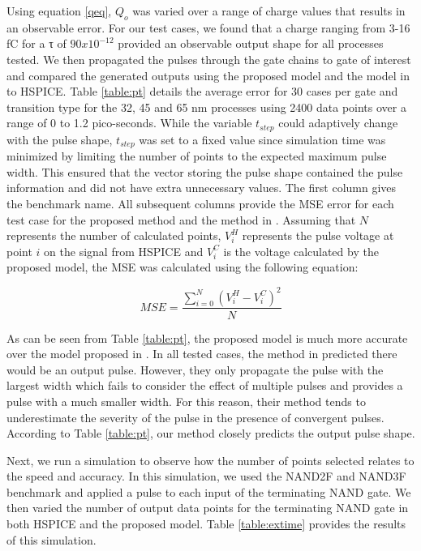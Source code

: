 Using equation \ref{qeq}, $Q_o$ was varied over a range of charge values that results in an observable error. For our test cases, we found that a charge ranging from 3-16 fC for a τ of $90x10^{-12}$ provided an observable output shape for all processes tested. We then propagated the pulses through the gate chains to gate of interest and compared the generated outputs using the proposed model and the model in \cite{Accurate_Masking} to HSPICE. Table \ref{table:pt} details the average error for 30 cases per gate and transition type for the 32, 45 and 65 nm processes using 2400 data points over a range of 0 to 1.2 pico-seconds. While the variable $t_{step}$ could adaptively change with the pulse shape, $t_{step}$ was set to a fixed value since simulation time was minimized by limiting the number of points to the expected maximum pulse width. This ensured that the vector storing the pulse shape contained the pulse information and did not have extra unnecessary values. The first column gives the benchmark name. All subsequent columns provide the MSE error for each test case for the proposed method and the method in \cite{Accurate_Masking}. Assuming that $N$ represents the number of calculated points, $V_i^H$ represents the pulse voltage at point $i$ on the signal from HSPICE and $V_i^C$ is the voltage calculated by the proposed model, the MSE was calculated using the following equation:

\begin{equation}
MSE = \frac{\sum_{i=0}^{N} (V_i^H - V_i^C)^2}{N}
\end{equation}

As can be seen from Table \ref{table:pt}, the proposed model is much more accurate over the model proposed in \cite{Accurate_Masking}. In all tested cases, the method in \cite{Accurate_Masking} predicted there would be an output pulse. However, they only propagate the pulse with the largest width which fails to consider the effect of multiple pulses and provides a pulse with a much smaller width. For this reason, their method tends to underestimate the severity of the pulse in the presence of convergent pulses. According to Table \ref{table:pt}, our method closely predicts the output pulse shape.

Next, we run a simulation to observe how the number of points selected relates to the speed and accuracy. In this simulation, we used the NAND2F and NAND3F benchmark and applied a pulse to each input of the terminating NAND gate. We then varied the number of output data points for the terminating NAND gate in both HSPICE and the proposed model. Table \ref{table:extime} provides the results of this simulation.

